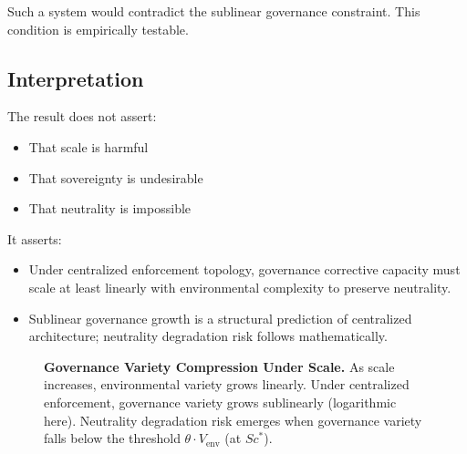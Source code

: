\documentclass{article}
\begin{document}
Such a system would contradict the sublinear governance constraint. This condition is empirically testable.

\subsection{Interpretation}

The result does not assert:
\begin{itemize}[noitemsep]
    \item That scale is harmful
    \item That sovereignty is undesirable
    \item That neutrality is impossible
\end{itemize}

It asserts:
\begin{itemize}[noitemsep]
    \item Under centralized enforcement topology, governance corrective capacity must scale at least linearly with environmental complexity to preserve neutrality.
    \item Sublinear governance growth is a structural prediction of centralized architecture; neutrality degradation risk follows mathematically.
\end{itemize}

\begin{figure}[htbp]
\centering
{}
\caption{\textbf{Governance Variety Compression Under Scale.} As scale increases, environmental variety grows linearly. Under centralized enforcement, governance variety grows sublinearly (logarithmic here). Neutrality degradation risk emerges when governance variety falls below the threshold $\theta \cdot V_{\text{env}}$ (at $Sc^*$).}
\label{fig:variety-compression}
\end{figure}
\end{document}
